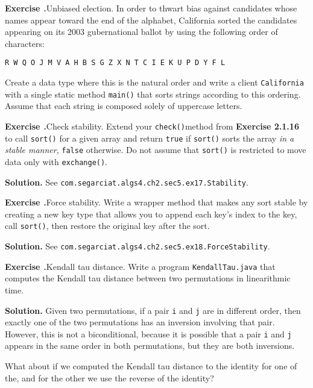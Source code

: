 \documentclass[12pt, a4paper]{article}
\newenvironment{ex}[2][Exercise]
{\par\medskip\noindent \textbf{#1 #2.}}
{\medskip}
\newenvironment{sol}[1][Solution]
{\par\medskip\noindent \textbf{#1.} }
{\medskip}
\begin{document}
	\begin{ex}{16}
		\emph{Unbiased election}. In order to thwart bias against candidates whose
		names appear toward the end of the alphabet, California sorted the candidates
		appearing on its 2003 gubernational ballot by using the following order of
		characters:
		\begin{lstlisting}[language={}]
		R W Q O J M V A H B S G Z X N T C I E K U P D Y F L
		\end{lstlisting}
		Create a data type where this is the natural order and write a client \texttt{California}
		with a single static method \texttt{main()} that sorts strings according to this
		ordering. Assume that each string is composed solely of uppercase letters.
	\end{ex}
	
	\begin{ex}{17}
		\emph{Check stability}. Extend your \texttt{check()}method from \textbf{Exercise 2.1.16}
		to call \texttt{sort()} for a given array and return \texttt{true} if \texttt{sort()}
		sorts the array \emph{in a stable manner}, \texttt{false} otherwise. Do not assume that
		\texttt{sort()} is restricted to move data only with \texttt{exchange()}.
	\end{ex}
	\begin{sol}
		See \texttt{com.segarciat.algs4.ch2.sec5.ex17.Stability}.
	\end{sol}
	\begin{ex}{18}
		\emph{Force stability}. Write a wrapper method that makes any sort stable by creating
		a new key type that allows you to append each key's index to the key, call
		\texttt{sort()}, then restore the original key after the sort.
	\end{ex}
	\begin{sol}
		See \texttt{com.segarciat.algs4.ch2.sec5.ex18.ForceStability}.
	\end{sol}
	\begin{ex}{19}
		\emph{Kendall tau distance}. Write a program \texttt{KendallTau.java} that computes
		the Kendall tau distance between two permutations in linearithmic time.
	\end{ex}
	\begin{sol}
		Given two permutations, if a pair \texttt{i} and \texttt{j} are in different
		order, then exactly one of the two permutations has an inversion involving that
		pair. However, this is not a biconditional, because it is possible that a pair
		\texttt{i} and \texttt{j} appears in the same order in both permutations, but
		they are both inversions.
		
		What about if we computed the Kendall tau distance to the identity for one of
		the, and for the other we use the reverse of the identity?
	\end{sol}
	\pagebreak
	\printbibliography
\end{document}
